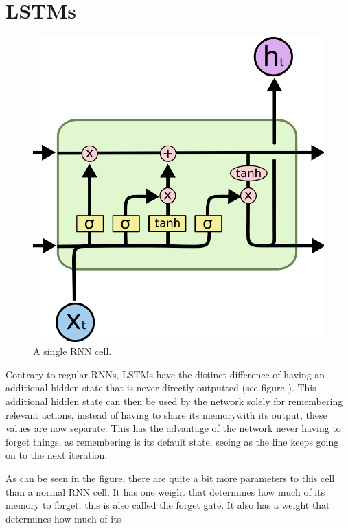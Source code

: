 \section{LSTMs}

\begin{figure}
	\begin{center}
		\includegraphics[scale=0.5]{rnn/lstm_cell}
	\end{center}
	\caption{A single RNN cell.\label{fig:lstm_cell}}
\end{figure}

Contrary to regular RNNs, LSTMs have the distinct difference of having an additional hidden state that is never directly outputted (see figure \cite{fig:lstm_cell}). This additional hidden state can then be used by the network solely for remembering relevant actions, instead of having to share its \"memory\" with its output, these values are now separate. This has the advantage of the network never having to forget things, as remembering is its default state, seeing as the line keeps going on to the next iteration.

As can be seen in the figure, there are quite a bit more parameters to this cell than a normal RNN cell. It has one weight that determines how much of its memory to \"forget\", this is also called the \"forget gate\". It also has a weight that determines how much of its 